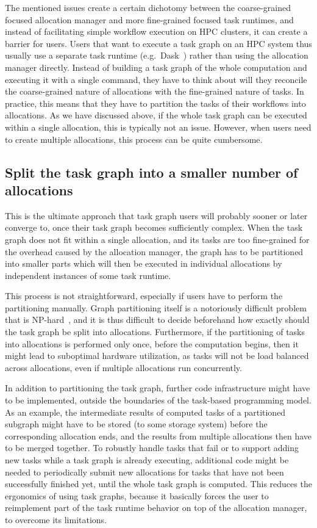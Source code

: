 The mentioned issues create a certain dichotomy between the coarse-grained focused allocation
manager and more fine-grained focused task runtimes, and instead of facilitating simple workflow
execution on HPC clusters, it can create a barrier for users. Users that want to execute a task
graph on an HPC system thus usually use a separate task runtime (e.g.\
Dask~\cite{dask}) rather than using the allocation manager directly. Instead of
building a task graph of the whole computation and executing it with a single command, they have to
think about will they reconcile the coarse-grained nature of allocations with the fine-grained
nature of tasks. In practice, this means that they have to partition the tasks of their workflows
into allocations. As we have discussed above, if the whole task graph can be executed within a
single allocation, this is typically not an issue. However, when users need to create multiple
allocations, this process can be quite cumbersome.

\subsection*{Split the task graph into a smaller number of allocations}
This is the ultimate approach that task graph users will probably sooner or later converge to, once
their task graph becomes sufficiently complex. When the task graph does not fit within a single
allocation, and its tasks are too fine-grained for the overhead caused by the allocation manager,
the graph has to be partitioned into smaller parts which will then be executed in individual
allocations by independent instances of some task runtime.

This process is not straightforward, especially if users have to perform the partitioning manually.
Graph partitioning itself is a notoriously difficult problem that is
NP-hard~\cite{graph_partitioning}\todo{Ada: Is this OK?}, and it is thus difficult to decide
beforehand how exactly should the task graph be split into allocations. Furthermore, if the
partitioning of tasks into allocations is performed only once, before the computation begins, then
it might lead to suboptimal hardware utilization, as tasks will not be load balanced across
allocations, even if multiple allocations run concurrently.

In addition to partitioning the task graph, further code infrastructure might have to be
implemented, outside the boundaries of the task-based programming model. As an example, the
intermediate results of computed tasks of a partitioned subgraph might have to be stored (to some
storage system) before the corresponding allocation ends, and the results from multiple allocations
then have to be merged together. To robustly handle tasks that fail or to support adding new tasks
while a task graph is already executing, additional code might be needed to periodically submit new
allocations for tasks that have not been successfully finished yet, until the whole task graph is
computed. This reduces the ergonomics of using task graphs, because it basically forces the user to
reimplement part of the task runtime behavior on top of the allocation manager, to overcome its
limitations.


